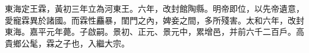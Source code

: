 \begin{pinyinscope}
 
 
 東海定王霖，黃初三年立為河東王。六年，改封館陶縣。明帝即位，以先帝遺意，愛寵霖異於諸國。而霖性麤暴，閨門之內，婢妾之間，多所殘害。太和六年，改封東海。嘉平元年薨。子啟嗣。景初、正元、景元中，累增邑，并前六千二百戶。高貴鄉公髦，霖之子也，入繼大宗。
 
 
\end{pinyinscope}